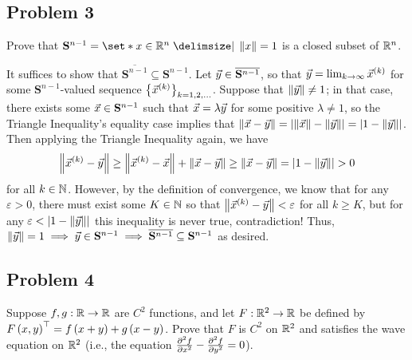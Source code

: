 \documentclass[main.tex]{subfiles}
\begin{document}
\subsection{Problem 3}
\begin{claim}
    Prove that $\mathbf{S}^{n - 1} = \set*{x \in \RR^n \mid \norm{x} = 1}$ is a closed subset of $\mathbb R^n$.
\end{claim}

\begin{soln}
    It suffices to show that $\overline{\mathbf{S}^{n - 1}}\subseteq \mathbf{S}^{n - 1}$. Let $\vec{y}\in \overline{\mathbf{S}^{n - 1}}$, so that $\vec{y} = \lim_{k\to \infty} \vec{x}^{(k)}$ for some $\mathbf{S}^{n - 1}$-valued sequence $\left\{ \vec{x}^{(k)} \right\}_{k = 1, 2, \ldots}$. Suppose that $\left\lVert \vec{y} \right\rVert \neq 1$; in that case, there exists some $\vec{x}\in \mathbf{S}^{n - 1}$ such that $\vec{x} = \lambda \vec{y}$ for some positive $\lambda \neq 1$, so the Triangle Inequality's equality case implies that $\left\lVert \vec{x} - \vec{y} \right\rVert = \left\lvert \left\lVert \vec{x} \right\rVert - \left\lVert \vec{y} \right\rVert \right\rvert = \left\lvert 1 - \left\lVert \vec{y} \right\rVert \right\rvert$. Then applying the Triangle Inequality again, we have
    \[\left\lVert \vec{x}^{(k)} - \vec{y} \right\rVert \ge \left\lVert \vec{x}^{(k)} - \vec{x} \right\rVert + \left\lVert \vec{x} - \vec{y} \right\rVert\ge \left\lVert \vec{x} - \vec{y} \right\rVert = \left\lvert 1 - \left\lVert \vec{y} \right\rVert \right\rvert > 0\]
    for all $k\in \mathbb N$. However, by the definition of convergence, we know that for any $\varepsilon > 0$, there must exist some $K\in \mathbb N$ so that $\left\lVert \vec{x}^{(k)} - \vec{y} \right\rVert < \varepsilon$ for all $k \ge K$, but for any $\varepsilon < \left\lvert 1 - \left\lVert \vec{y} \right\rVert \right\rvert$ this inequality is never true, contradiction! Thus, $\left\lVert \vec{y} \right\rVert = 1\implies \vec{y}\in \mathbf{S}^{n - 1}\implies \overline{\mathbf{S}^{n - 1}}\subseteq \mathbf{S}^{n - 1}$ as desired.
\end{soln}
\eject

\subsection{Problem 4}
\begin{claim}
    Suppose $f, g : \mathbb R\to \mathbb R$ are $C^2$ functions, and let $F : \mathbb R^2\to \mathbb R$ be defined by $F \left( x, y \right)^\top = f \left( x + y \right) + g\left( x - y \right)$. Prove that $F$ is $C^2$ on $\mathbb R^2$ and satisfies the wave equation on $\mathbb R^2$ (i.e., the equation $\pdv[order = {2}]{f}{x} - \pdv[order = {2}]{f}{y} = 0$).
\end{claim}
\end{document}

